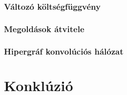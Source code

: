 \subsection{Változó költségfüggvény}


\subsection{Megoldások átvitele}


\subsection{Hipergráf konvolúciós hálózat}



\cleardoublepage
\chapter{Konklúzió}

